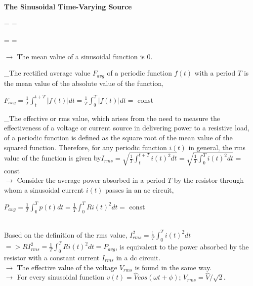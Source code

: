 \documentclass[a4paper,12pt,oneside]{report}
\newenvironment{tree}[4]{
\begin{list}{#1}{\parskip=0in \topsep=0in \itemsep=0in \parsep=0in \partopsep=0in \leftmargin=#2 \rightmargin=#3 \itemindent=#4 \listparindent=\itemindent}
}{\end{list}}
\newenvironment{ssection}[3]{
\framebox{\textbf{#1}} \textbf{#2}
\begin{tree}{#3}{0in}{0in}{\parindent}
}{\end{tree}}
\begin{document}
\begin{ssection}{1}{The Sinusoidal Time-Varying Source}{\textbullet}
\begin{tree}{{}}{\parindent}{0in}{0in}
\phantom{indent} $\rightarrow$ The mean value of a sinusoidal function is $0$.
\item \_The rectified average value $F_{avg}$ of a periodic function $f(t)$ with a period $T$ is the mean value of the absolute value of the function,\\
\centerline{$F_{avg}=\displaystyle\frac{1}{T}\int_{t}^{t+T}{|f(t)|dt}=\frac{1}{T}\int_{0}^{T}{|f(t)|dt}=$ const}
\item \_The effective or rms value, which arises from the need to measure the effectiveness of a voltage or current source in delivering power to a resistive load, of a periodic function is defined as the square root of the mean value of the squared function. Therefore, for any periodic function $i(t)$ in general, the rms value of the function is given by\qquad $I_{rms}=\displaystyle\sqrt{\frac{1}{T}\int_{t}^{t+T}{i(t)^{2}dt}}=\sqrt{\frac{1}{T}\int_{0}^{T}{i(t)^{2}dt}}=$ const\\
$\rightarrow$ Consider the average power absorbed in a period $T$ by the resistor through whom a sinusoidal current $i(t)$ passes in an ac circuit,\\
\centerline{$P_{avg}=\displaystyle\frac{1}{T}\int_{0}^{T}{p(t)dt}=\frac{1}{T}\int_{0}^{T}{Ri(t)^{2}dt}=$ const}\\
\phantom{$\rightarrow$} Based on the definition of the rms value, $I_{rms}^{2}=\displaystyle\frac{1}{T}\int_{0}^{T}{i(t)^{2}dt}$\\
\phantom{$\rightarrow$}$=>$\space$RI_{rms}^{2}=\displaystyle\frac{1}{T}\int_{0}^{T}{Ri(t)^{2}dt}=P_{avg}$, is equivalent to the power absorbed by the resistor with a constant current $I_{rms}$ in a dc circuit. \\
$\rightarrow$ The effective value of the voltage $V_{rms}$ is found in the same way.\\
$\rightarrow$ For every sinusoidal function $v(t)=\widehat{V}cos(\omega t+\phi)$; $V_{rms}=\widehat{V}/\sqrt{2}$.
\end{tree}
\end{ssection}
\end{document}

